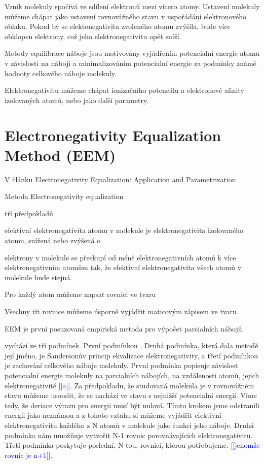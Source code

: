 \documentclass[
  color, %
  table, %
  lof,   %
  lot,   %
]{fithesis3}
\newcommand\todo[1]{\textcolor{blue}{[[#1]]}}
\begin{document}
Vznik molekuly spočívá ve sdílení elektronů mezi vícero atomy. Ustavení molekuly můžeme chápat jako ustavení rovnovážného stavu v uspořádání elektronového oblaku. Pokud by se elektonegativita zvoleného atomu zvýšíla, bude více obklopen elektrony, což jeho elektronegativitu opět sníží.

Metody equilibrace náboje jsou motivovány vyjádřením potencialní energie atomu v závislosti na náboji a minimalizováním potencialní energie za podmínky známé hodnoty celkového náboje molekuly.

Elektronegativitu můžeme chápat ionizačního potencálu a elektronové afinity izolovaných atomů, nebo jako další parametry.

\section{Electronegativity Equalization Method (EEM)}

V článku Electronegativity Equalization: Application and Parametrization



Metoda Electronegativity equalization

tří předpokladů

efektivní elektronegativita atomu v molekule je elektronegativita izolovaného atomu, snížená nebo zvýšená o

elektrony v molekule se přeskupí od méně elektronegativních atomů k více elektronegativním atomům tak, že efektivní elektronegativita všech atomů v molekule bude stejná.

Pro každý atom můžeme napsat rovnici ve tvaru

Všechny tři rovnice můžeme úsporně vyjádřit maticovým zápisem ve tvaru


EEM je první posuzovaná empirická metoda pro výpočet parcialních nábojů.

vychází ze tří podmínek. První podmínkou . Druhá podmínka, která dala metodě její jméno, je Sandersonův princip ekvalizace elektronegativity, a třetí podmínkou je zachování celkového náboje molekuly. První podmínka popisuje závislost potencialní energie molekuly na parcialních nábojích, na vzdálenosti atomů, jejich elektronegativitě \todo{a}. Za předpokladu, že studovaná molekula je v rovnovážném stavu můžeme usoudit, že se nachází ve stavu s nejnižší potencialní energií. Víme tedy, že deriace výrazu pro energii musí být nulová. Tímto krokem jsme odstranili energii jako neznámou a z tohoto vztahu si můžeme vyjádřit efektivní elektronegativitu každého z N atomů v molekule jako funkci jeho náboje. Druhá podmínka nám umožňuje vytvořit N-1 rovnic porovnávajících elektronegativitu. Třetí podmínka poskytuje poslední, N-tou, rovnici, kterou potřebujeme. \todo{jenomže rovnic je n+1}.
\end{document}
